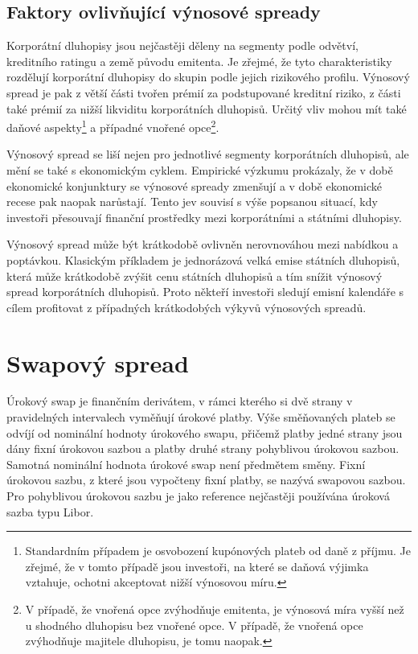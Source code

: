 \documentclass[a4paper]{book}
\begin{document}
\subsection{Faktory ovlivňující výnosové spready}

Korporátní dluhopisy jsou nejčastěji děleny na segmenty podle odvětví, kreditního ratingu a země původu emitenta. Je zřejmé, že tyto charakteristiky rozdělují korporátní dluhopisy do skupin podle jejich rizikového profilu. Výnosový spread je pak z větší části tvořen prémií za podstupované kreditní riziko, z části také prémií za nižší likviditu korporátních dluhopisů. Určitý vliv mohou mít také daňové aspekty\footnote{Standardním případem je osvobození kupónových plateb od daně z příjmu. Je zřejmé, že v tomto případě jsou investoři, na které se daňová výjimka vztahuje, ochotni akceptovat nižší výnosovou míru.} a případné vnořené opce\footnote{V případě, že vnořená opce zvýhodňuje emitenta, je výnosová míra vyšší než u shodného dluhopisu bez vnořené opce. V případě, že vnořená opce zvýhodňuje majitele dluhopisu, je tomu naopak.}.

Výnosový spread se liší nejen pro jednotlivé segmenty korporátních dluhopisů, ale mění se také s ekonomickým cyklem. Empirické výzkumu prokázaly, že v době ekonomické konjunktury se výnosové spready zmenšují a v době ekonomické recese pak naopak narůstají. Tento jev souvisí s výše popsanou situací, kdy investoři přesouvají finanční prostředky mezi korporátními a státními dluhopisy.

Výnosový spread může být krátkodobě ovlivněn nerovnováhou mezi nabídkou a poptávkou. Klasickým příkladem je jednorázová velká emise státních dluhopisů, která může krátkodobě zvýšit cenu státních dluhopisů a tím snížit výnosový spread korporátních dluhopisů. Proto někteří investoři sledují emisní kalendáře s cílem profitovat z případných krátkodobých výkyvů výnosových spreadů.

\section{Swapový spread}

Úrokový swap je finančním derivátem, v rámci kterého si dvě strany v pravidelných intervalech vyměňují úrokové platby. Výše směňovaných plateb se odvíjí od nominální hodnoty úrokového swapu, přičemž platby jedné strany jsou dány fixní  úrokovou sazbou a platby druhé strany pohyblivou úrokovou sazbou. Samotná nominální hodnota úrokové swap není předmětem směny. Fixní úrokovou sazbu, z které jsou vypočteny fixní platby, se nazývá swapovou sazbou. Pro pohyblivou úrokovou sazbu je jako reference nejčastěji používána úroková sazba typu Libor.
\end{document}
